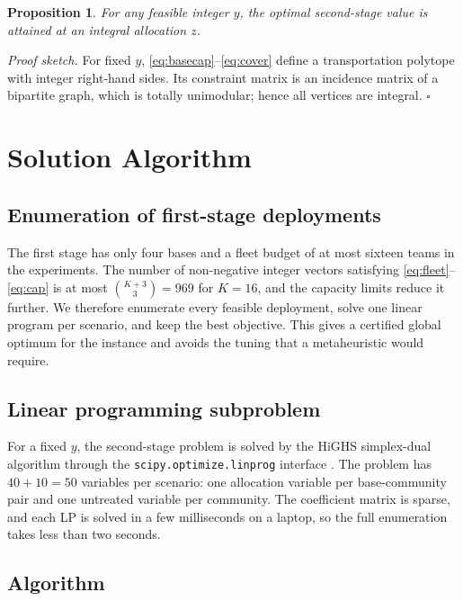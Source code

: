 \documentclass{apmcmthesis}
\newtheorem{proposition}{Proposition}
\begin{document}
\begin{proposition}
For any feasible integer $y$, the optimal second-stage value is attained at an integral allocation $z$.
\end{proposition}

\noindent\textit{Proof sketch.} For fixed $y$, \eqref{eq:basecap}--\eqref{eq:cover} define a transportation polytope with integer right-hand sides. Its constraint matrix is an incidence matrix of a bipartite graph, which is totally unimodular; hence all vertices are integral. \hfill$\square$

\section{Solution Algorithm}

\subsection{Enumeration of first-stage deployments}

The first stage has only four bases and a fleet budget of at most sixteen teams in the experiments. The number of non-negative integer vectors satisfying \eqref{eq:fleet}--\eqref{eq:cap} is at most $\binom{K+3}{3}=969$ for $K=16$, and the capacity limits reduce it further. We therefore enumerate every feasible deployment, solve one linear program per scenario, and keep the best objective. This gives a certified global optimum for the instance and avoids the tuning that a metaheuristic would require.

\subsection{Linear programming subproblem}

For a fixed $y$, the second-stage problem is solved by the HiGHS simplex-dual algorithm through the \texttt{scipy.optimize.linprog} interface \cite{virtanen2020}. The problem has $40+10=50$ variables per scenario: one allocation variable per base-community pair and one untreated variable per community. The coefficient matrix is sparse, and each LP is solved in a few milliseconds on a laptop, so the full enumeration takes less than two seconds.

\subsection{Algorithm}
\end{document}
